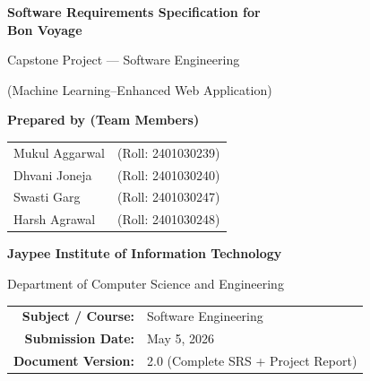 \documentclass[12pt,oneside,openany]{report}
\begin{document}
\thispagestyle{empty}

\begin{titlepage}
\centering
\vspace*{1.2cm}

{\Large\bfseries Software Requirements Specification for\\[0.35cm]
Bon Voyage\par}

\vspace{1.2cm}

{\large Capstone Project --- Software Engineering\par}
{\normalsize (Machine Learning--Enhanced Web Application)\par}

\vspace{2.2cm}

{\normalsize\bfseries Prepared by (Team Members)\par}
\vspace{0.6cm}

\begin{tabular}{ll}
Mukul Aggarwal & (Roll: 2401030239) \\
Dhvani Joneja  & (Roll: 2401030240) \\
Swasti Garg    & (Roll: 2401030247) \\
Harsh Agrawal  & (Roll: 2401030248) \\
\end{tabular}

\vspace{1.8cm}

{\normalsize\bfseries Jaypee Institute of Information Technology\par}
{\normalsize Department of Computer Science and Engineering\par}


\vfill

\begin{tabular}{rl}
\textbf{Subject / Course:} & Software Engineering \\
\textbf{Submission Date:}  & May 5, 2026 \\
\textbf{Document Version:} & 2.0 (Complete SRS + Project Report) \\
\end{tabular}

\vspace{1.2cm}
\end{titlepage}
\end{document}
